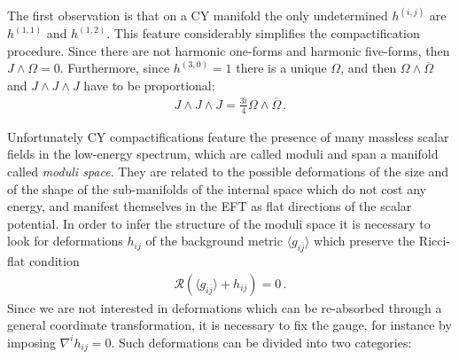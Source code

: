 \documentclass[12pt,a4paper]{book}
\begin{document}
The first observation is that on a CY manifold the only undetermined $h^{(i,j)}$ are $h^{(1,1)}$ and $h^{(1,2)}$. This feature considerably simplifies the compactification procedure. Since there are not harmonic one-forms and harmonic five-forms, then $J \wedge \Omega = 0$. Furthermore, since $h^{(3,0)} = 1$ there is a unique $\Omega$, and then $\Omega \wedge \overline{\Omega}$ and $J \wedge J \wedge J$ have to be proportional:
\begin{align}
\label{eq:ConventionJOmega}
J \wedge J \wedge J = \frac{3 i}{4} \Omega \wedge \overline{\Omega}\,.
\end{align}

Unfortunately CY compactifications feature the presence of many massless scalar fields in the low-energy spectrum, which are called moduli and span a manifold called \textit{moduli space}. They are related to the possible deformations of the size and of the shape of the sub-manifolds of the internal space which do not cost any energy, and manifest themselves in the EFT as flat directions of the scalar potential. In order to infer the structure of the moduli space it is necessary to look for deformations $h_{ij}$ of the background metric $\langle g_{i \overline{j}} \rangle$ which preserve the Ricci-flat condition
\begin{align}
\label{eq:DeformationRicciFlat}
\mathcal{R}(\langle g_{i \overline{j}} \rangle + h_{ij}) = 0 \,.
\end{align}
Since we are not interested in deformations which can be re-absorbed through a general coordinate transformation, it is necessary to fix the gauge, for instance by imposing $\nabla^i h_{ij} = 0$. Such deformations can be divided into two categories:	
\end{document}
